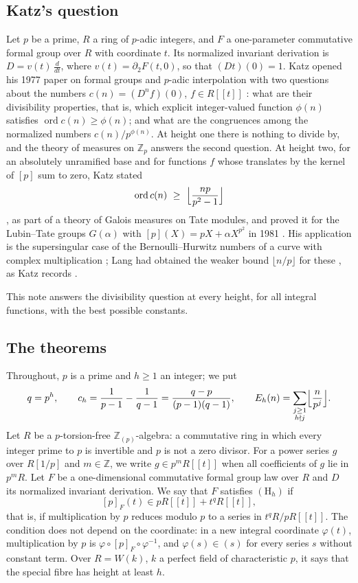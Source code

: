 \documentclass[11pt]{amsart}
\theoremstyle{definition}
\theoremstyle{remark}
\newcommand{\Z}{\mathbb Z}
\begin{document}
\subsection{Katz's question}
Let $p$ be a prime, $R$ a ring of $p$-adic integers, and $F$ a one-parameter commutative formal group over $R$ with coordinate $t$. Its normalized invariant derivation is $D=v(t)\,\frac{d}{dt}$, where $v(t)=\partial_2F(t,0)$, so that $(Dt)(0)=1$. Katz opened his 1977 paper on formal groups and $p$-adic interpolation with two questions about the numbers $c(n)=(D^nf)(0)$, $f\in R[[t]]$ \cite[\S I, pp.~55--56]{Katz77}: what are their divisibility properties, that is, which explicit integer-valued function $\phi(n)$ satisfies $\operatorname{ord}c(n)\ge\phi(n)$; and what are the congruences among the normalized numbers $c(n)/p^{\phi(n)}$. At height one there is nothing to divide by, and the theory of measures on $\Z_p$ answers the second question. At height two, for an absolutely unramified base and for functions $f$ whose translates by the kernel of $[p]$ sum to zero, Katz stated
\[
 \operatorname{ord}c(n)\ \ge\ \Bigl\lfloor\frac{np}{p^2-1}\Bigr\rfloor
\]
\cite[\S V, Lemma 1 and Corollary 2, pp.~62--63]{Katz77}, as part of a theory of Galois measures on Tate modules, and proved it for the Lubin--Tate groups $G(\alpha)$ with $[p](X)=pX+\alpha X^{p^2}$ in 1981 \cite[Main Theorem 3.11(I), p.~672]{Katz81}. His application is the supersingular case of the Bernoulli--Hurwitz numbers of a curve with complex multiplication \cite[\S IV]{Katz81}; Lang had obtained the weaker bound $\lfloor n/p\rfloor$ for these \cite{Lang69}, as Katz records \cite[p.~63]{Katz77}.

This note answers the divisibility question at every height, for all integral functions, with the best possible constants.

\subsection{The theorems}
Throughout, $p$ is a prime and $h\ge1$ an integer; we put
\[
 q=p^h,\qquad c_h=\frac1{p-1}-\frac1{q-1}=\frac{q-p}{(p-1)(q-1)},\qquad
 E_h(n)=\sum_{\substack{j\ge1\\ h\nmid j}}\Bigl\lfloor\frac n{p^j}\Bigr\rfloor .
\]
Let $R$ be a $p$-torsion-free $\Z_{(p)}$-algebra: a commutative ring in which every integer prime to $p$ is invertible and $p$ is not a zero divisor. For a power series $g$ over $R[1/p]$ and $m\in\Z$, we write $g\in p^mR[[t]]$ when all coefficients of $g$ lie in $p^mR$. Let $F$ be a one-dimensional commutative formal group law over $R$ and $D$ its normalized invariant derivation. We say that $F$ satisfies $(\mathrm H_h)$ if
\[
 [p]_F(t)\in pR[[t]]+t^{q}R[[t]] ,
\]
that is, if multiplication by $p$ reduces modulo $p$ to a series in $t^q R/pR[[t]]$. The condition does not depend on the coordinate: in a new integral coordinate $\varphi(t)$, multiplication by $p$ is $\varphi\circ[p]_F\circ\varphi^{-1}$, and $\varphi(s)\in(s)$ for every series $s$ without constant term. Over $R=W(k)$, $k$ a perfect field of characteristic $p$, it says that the special fibre has height at least $h$.
\end{document}
